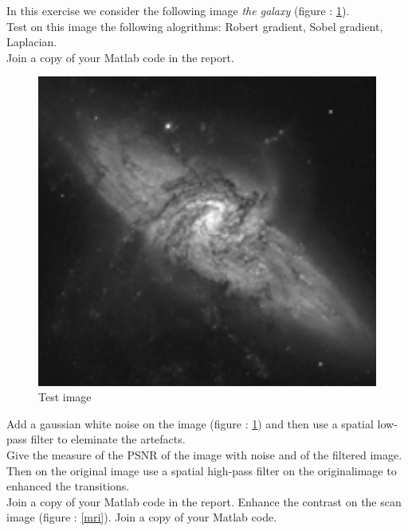 \documentclass[12pt]{tdtp}
\begin{document}
\titre

\Exo

In this exercise we consider the following image \textit{the galaxy} (figure : \ref{Galaxy}).\\
Test on this image the following alogrithms: Robert gradient, Sobel gradient, Laplacian.\\
Join a copy of your Matlab code in the report.


\begin{figure}[h!]
	\begin{center}
		\includegraphics[scale=0.5]{images/galaxy.png}
		\caption{Test image}
		\label{Galaxy}
	\end{center}
\end{figure}

\newpage 
\Exo


Add a gaussian white noise on the image (figure : \ref{Galaxy}) and then use a spatial low-pass filter to eleminate the artefacts.\\
Give the measure of the PSNR of the image with noise and of the filtered image.\\
Then on the original image use a spatial high-pass filter on the originalimage to enhanced the transitions.\\
Join a copy of your Matlab code in the report.
\newpage 
\Exo
Enhance the contrast on the scan image (figure : \ref{mri}).
Join a copy of your Matlab code.
\end{document}
